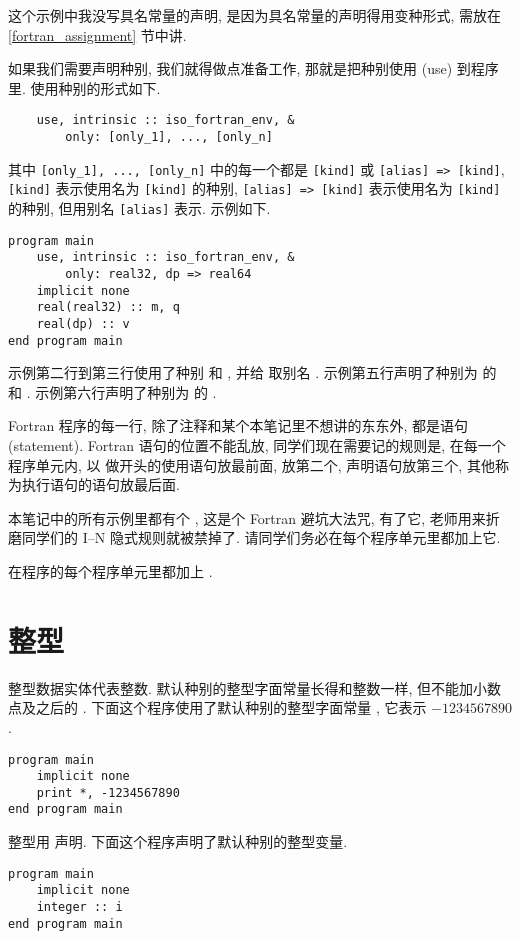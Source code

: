 这个示例中我没写具名常量的声明, 是因为具名常量的声明得用变种形式, 需放在 \ref{fortran_assignment} 节中讲.

如果我们需要声明种别, 我们就得做点准备工作, 那就是把种别使用 (use) 到程序里. 使用种别的形式如下.
\begin{lstlisting}
    use, intrinsic :: iso_fortran_env, &
        only: [only_1], ..., [only_n]
\end{lstlisting}
其中 \texttt{[only\_{}1], ..., [only\_{}n]} 中的每一个都是 \texttt{[kind]} 或 \texttt{[alias] => [kind]}, \texttt{[kind]} 表示使用名为 \texttt{[kind]} 的种别, \texttt{[alias] => [kind]} 表示使用名为 \texttt{[kind]} 的种别, 但用别名 \texttt{[alias]} 表示. 示例如下.
\begin{lstlisting}
program main
    use, intrinsic :: iso_fortran_env, &
        only: real32, dp => real64
    implicit none
    real(real32) :: m, q
    real(dp) :: v
end program main
\end{lstlisting}
示例第二行到第三行使用了种别  和 , 并给  取别名 . 示例第五行声明了种别为  的  和 . 示例第六行声明了种别为  的 .

Fortran 程序的每一行, 除了注释和某个本笔记里不想讲的东东外, 都是语句 (statement). Fortran 语句的位置不能乱放, 同学们现在需要记的规则是, 在每一个程序单元内, 以  做开头的使用语句放最前面,  放第二个, 声明语句放第三个, 其他称为执行语句的语句放最后面.

本笔记中的所有示例里都有个 , 这是个 Fortran 避坑大法咒, 有了它, 老师用来折磨同学们的 I--N 隐式规则就被禁掉了. 请同学们务必在每个程序单元里都加上它.
\begin{convention}
    在程序的每个程序单元里都加上 .
\end{convention}

\section{整型}

整型数据实体代表整数. 默认种别的整型字面常量长得和整数一样, 但不能加小数点及之后的 . 下面这个程序使用了默认种别的整型字面常量 , 它表示 $-1234567890$.
\begin{lstlisting}
program main
    implicit none
    print *, -1234567890
end program main
\end{lstlisting}

整型用  声明. 下面这个程序声明了默认种别的整型变量.
\begin{lstlisting}
program main
    implicit none
    integer :: i
end program main
\end{lstlisting}

